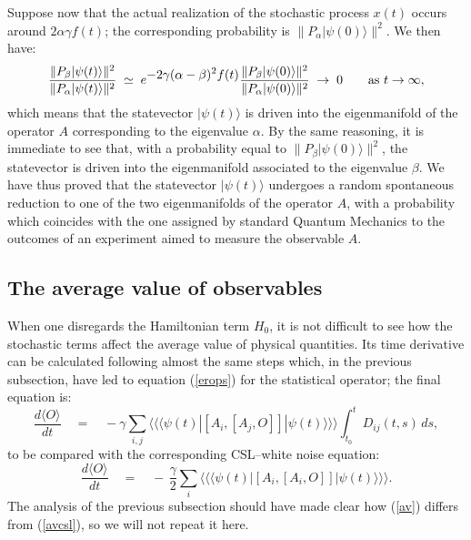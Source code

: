 \documentclass[12pt]{article}
\newcommand{\llangle}{\langle\!\langle}
\newcommand{\rrangle}{\rangle\!\rangle}
\begin{document}
Suppose now that the actual realization of the stochastic process
$x(t)$ occurs around $2\alpha\gamma f(t)$; the corresponding
probability is $\|P_{\alpha} |\psi(0)\rangle \|^{2}$. We then
have:
\begin{equation}
\frac{\|P_{\beta} |\psi(t)\rangle \|^{2}}{\|P_{\alpha}
|\psi(t)\rangle \|^{2}} \; \simeq \; e^{\displaystyle
-2\gamma(\alpha - \beta)^{2} f(t)} \frac{\|P_{\beta}
|\psi(0)\rangle \|^{2}}{\|P_{\alpha} |\psi(0)\rangle \|^{2}} \;
\rightarrow \; 0 \qquad \makebox{as $t \rightarrow \infty$},
\end{equation}
which means that the statevector $|\psi(t)\rangle$ is driven into
the eigenmanifold of the operator $A$ corresponding to the
eigenvalue $\alpha$. By the same reasoning, it is immediate to see
that, with a probability equal to $\|P_{\beta} |\psi(0)\rangle
\|^{2}$, the statevector is driven into the eigenmanifold
associated to the eigenvalue $\beta$. We have thus proved that the
statevector $|\psi(t)\rangle$  undergoes a random spontaneous
reduction to one of the two eigenmanifolds of the operator
$A$, with a probability which coincides with the one assigned by
standard Quantum Mechanics to the outcomes of an experiment aimed
to measure the observable $A$.

\subsection{The average value of observables} \label{nsec4}

When one disregards the Hamiltonian term $H_{0}$, it is not
difficult to see how the stochastic terms affect the average value
of physical quantities. Its time derivative can be calculated
following almost the same steps which, in the previous subsection,
have led to equation (\ref{erops}) for the statistical operator; the
final equation is:
\begin{equation} \label{av}
\frac{d\langle O\rangle}{dt} \quad  = \quad -\gamma \sum_{i,j}
\llangle \langle\psi(t)| \left[ A_{i},\left[ A_{j}, O
\right]\right] |\psi(t)\rangle \rrangle \int_{t_{0}}^{t}
D_{ij}(t,s)\, ds,
\end{equation}
to be compared with the corresponding CSL--white noise equation:
\begin{equation} \label{avcsl}
\frac{d\langle O\rangle}{dt} \quad  = \quad -\,\frac{\gamma}{2}
\sum_{i} \llangle \langle\psi(t)| \left[ A_{i},\left[ A_{i}, O
\right]\right] |\psi(t)\rangle \rrangle.
\end{equation}
The analysis of the previous subsection should have made clear how
(\ref{av}) differs from (\ref{avcsl}), so we will not repeat it
here.
\end{document}
